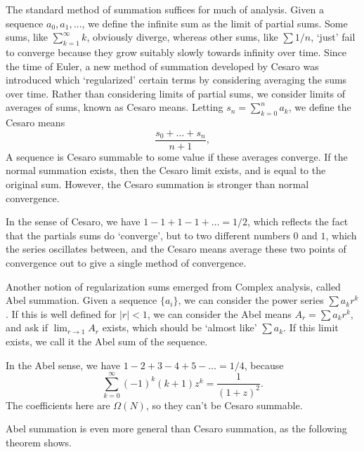 The standard method of summation suffices for much of analysis. Given a sequence $a_0, a_1, \dots$, we define the infinite sum as the limit of partial sums. Some sums, like $\sum_{k = 1}^\infty k$, obviously diverge, whereas other sums, like $\sum 1/n$, `just' fail to converge because they grow suitably slowly towards infinity over time. Since the time of Euler, a new method of summation developed by Cesaro was introduced which `regularized' certain terms by considering averaging the sums over time. Rather than considering limits of partial sums, we consider limits of averages of sums, known as Cesaro means. Letting $s_n = \sum_{k = 0}^n a_k$, we define the Cesaro means
%
\[ \frac{s_0 + \dots + s_n}{n+1}, \]
%
A sequence is Cesaro summable to some value if these averages converge. If the normal summation exists, then the Cesaro limit exists, and is equal to the original sum. However, the Cesaro summation is stronger than normal convergence.

\begin{example}
In the sense of Cesaro, we have $1 - 1 + 1 - 1 + \dots = 1/2$, which reflects the fact that the partials sums do `converge', but to two different numbers $0$ and $1$, which the series oscillates between, and the Cesaro means average these two points of convergence out to give a single method of convergence.
\end{example}

Another notion of regularization sums emerged from Complex analysis, called Abel summation. Given a sequence $\{ a_i \}$, we can consider the power series $\sum a_k r^k$. If this is well defined for $|r| < 1$, we can consider the Abel means $A_r = \sum a_k r^k$, and ask if $\lim_{r \to 1} A_r$ exists, which should be `almost like' $\sum a_k$. If this limit exists, we call it the Abel sum of the sequence.

\begin{example}
    In the Abel sense, we have $1 - 2 + 3 - 4 + 5 - \dots = 1/4$, because
    \[ \sum_{k = 0}^\infty (-1)^k (k + 1) z^k = \frac{1}{(1 + z)^2}. \]
    The coefficients here are $\Omega(N)$, so they can't be Cesaro summable.
\end{example}

Abel summation is even more general than Cesaro summation, as the following theorem shows.

